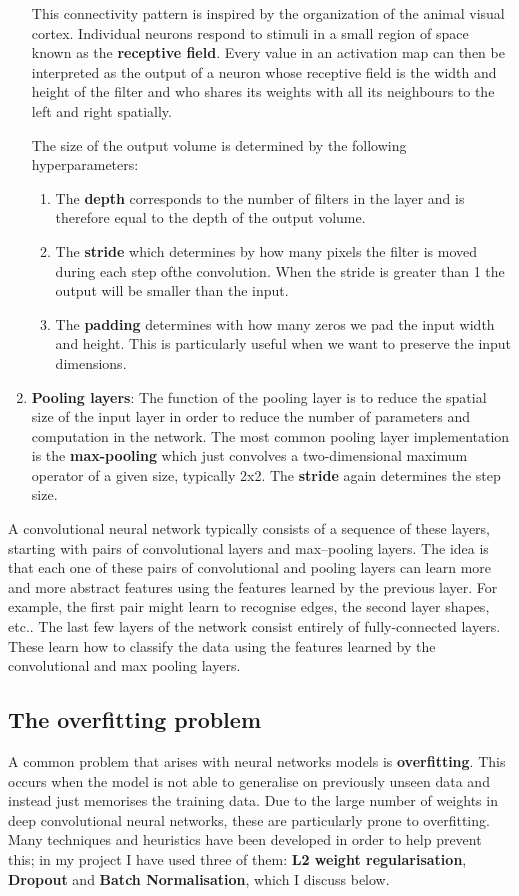 \documentclass[12pt,a4paper,twoside,openright]{report}
\begin{document}
\begin{enumerate}
	This connectivity pattern is inspired by the organization of the animal visual cortex. Individual neurons respond to stimuli in a small region of space known as the \textbf{receptive field}. Every value in an activation map can then be interpreted as the output of a neuron whose receptive field is the width and height of the filter and who shares its weights with all its neighbours to the left and right spatially.

	The size of the output volume is determined by the following hyperparameters:
	\begin{enumerate}
		\item The \textbf{depth} corresponds to the number of filters in the layer and is therefore equal to the depth of the output volume.
		\item The \textbf{stride} which determines by how many pixels the filter is moved during each step ofthe convolution. When the stride is greater than 1 the output will be smaller than the input.
		\item The \textbf{padding} determines with how many zeros we pad the input width and height. This is particularly useful when we want to preserve the input dimensions.
	\end{enumerate}
	
	\item \textbf{Pooling layers}: The function of the pooling layer is to reduce the spatial size of the input layer in order to reduce the number of parameters and computation in the network. The most common pooling layer implementation is the \textbf{max-pooling} which just convolves a two-dimensional maximum operator of a given size, typically 2x2. The \textbf{stride} again determines the step size.

\end{enumerate}

A convolutional neural network typically consists of a sequence of these layers, starting with pairs of convolutional layers and max--pooling layers. The idea is that each one of these pairs of convolutional and pooling layers can learn more and more abstract features using the features learned by the previous layer. For example, the first pair might learn to recognise edges, the second layer shapes, etc.. The last few layers of the network consist entirely of fully-connected layers. These learn how to classify the data using the features learned by the convolutional and max pooling layers.

\subsection{The overfitting problem}
A common problem that arises with neural networks models is \textbf{overfitting}. This occurs when the model is not able to generalise on previously unseen data and instead just memorises the training data. Due to the large number of weights in deep convolutional neural networks, these are particularly prone to overfitting. Many techniques and heuristics have been developed in order to help prevent this; in my project I have used three of them: \textbf{L2 weight regularisation}, \textbf{Dropout} and \textbf{Batch Normalisation}, which I discuss below.
\end{document}
